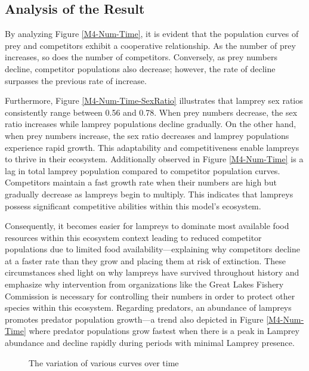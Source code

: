 \documentclass[12pt]{article}  %
\begin{document}
\subsection{Analysis of the Result}

By analyzing Figure \ref{M4-Num-Time}, it is evident that the population curves of prey and competitors exhibit a cooperative relationship. As the number of prey increases, so does the number of competitors. Conversely, as prey numbers decline, competitor populations also decrease; however, the rate of decline surpasses the previous rate of increase. 

Furthermore, Figure \ref{M4-Num-Time-SexRatio} illustrates that lamprey sex ratios consistently range between 0.56 and 0.78. When prey numbers decrease, the sex ratio increases while lamprey populations decline gradually. On the other hand, when prey numbers increase, the sex ratio decreases and lamprey populations experience rapid growth. This adaptability and competitiveness enable lampreys to thrive in their ecosystem. Additionally observed in Figure \ref{M4-Num-Time} is a lag in total lamprey population compared to competitor population curves. Competitors maintain a fast growth rate when their numbers are high but gradually decrease as lampreys begin to multiply. This indicates that lampreys possess significant competitive abilities within this model's ecosystem. 

Consequently, it becomes easier for lampreys to dominate most available food resources within this ecosystem context leading to reduced competitor populations due to limited food availability—explaining why competitors decline at a faster rate than they grow and placing them at risk of extinction. These circumstances shed light on why lampreys have survived throughout history and emphasize why intervention from organizations like the Great Lakes Fishery Commission \cite{6} is necessary for controlling their numbers in order to protect other species within this ecosystem. Regarding predators, an abundance of lampreys promotes predator population growth—a trend also depicted in Figure \ref{M4-Num-Time} where predator populations grow fastest when there is a peak in Lamprey abundance and decline rapidly during periods with minimal Lamprey presence.
\begin{figure}[htbp]
	\centering
	\quad    %
	\quad
	\quad
	\caption{The variation of various curves over time} \label{fig:AM4}
\end{figure}
\end{document}
